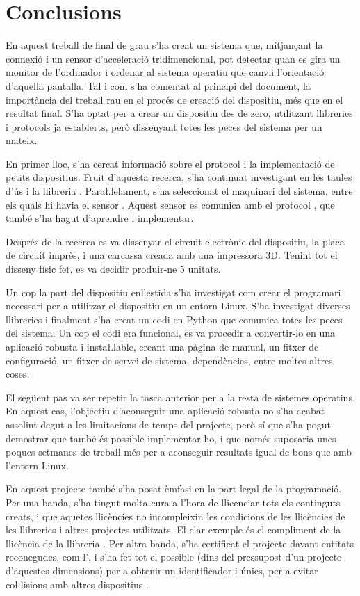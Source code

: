 \chapter{Conclusions}

En aquest treball de final de grau s'ha creat un sistema que, mitjançant la
connexió  i un sensor d'acceleració tridimencional, pot detectar quan
es gira un monitor de l'ordinador i ordenar al sistema operatiu que canvii
l'orientació d'aquella pantalla. Tal i com s'ha comentat al principi del
document, la importància del treball rau en el procés de creació del dispositiu,
més que en el resultat final. S'ha optat per a crear un dispositiu des de zero,
utilitzant llibreries i protocols ja establerts, però dissenyant totes les peces
del sistema per un mateix.

En primer lloc, s'ha cercat informació sobre el protocol  i la
implementació de petits dispositius. Fruit d'aquesta recerca, s'ha continuat
investigant en les taules d'ús  i la llibreria .
Para\l.lelament, s'ha seleccionat el maquinari del sistema, entre els quals hi
havia el sensor . Aquest sensor es comunica amb el protocol
, que també s'ha hagut d'aprendre i implementar.

Després de la recerca es va dissenyar el circuit electrònic del dispositiu,
la placa de circuit imprès, i una carcassa creada amb una impressora 3D.
Tenint tot el disseny físic fet, es va decidir produir-ne 5 unitats.

Un cop la part del dispositiu enllestida s'ha investigat com crear el
programari necessari per a utilitzar el dispositiu en un entorn Linux. S'ha
investigat diverses llibreries i finalment s'ha creat un codi en Python que
comunica totes les peces del sistema. Un cop el codi era funcional, es va
procedir a convertir-lo en una aplicació robusta i insta\l.lable, creant una
pàgina de manual, un fitxer de configuració, un fitxer de servei de sistema,
dependències, entre moltes altres coses.

El següent pas va ser repetir la tasca anterior per a la resta de sistemes
operatius. En aquest cas, l'objectiu d'aconseguir una aplicació robusta no s'ha
acabat assolint degut a les limitacions de temps del projecte, però sí que s'ha
pogut demostrar que també és possible implementar-ho, i que només suposaria
unes poques setmanes de treball més per a aconseguir resultats igual de bons
que amb l'entorn Linux.

En aquest projecte també s'ha posat èmfasi en la part legal de la programació.
Per una banda, s'ha tingut molta cura a l'hora de llicenciar tots els continguts
creats, i que aquetes llicències no incompleixin les condicions de les
llicències de les llibreries i altres projectes utilitzats. El clar exemple és
el compliment de la llicència de la llibreria . Per altra banda,
s'ha certificat el projecte davant entitats reconegudes, com l', i
s'ha fet tot el possible (dins del pressupost d'un projecte d'aquestes
dimensions) per a obtenir un identificador  i  únics, per a
evitar co\l.lisions amb altres dispositius .

